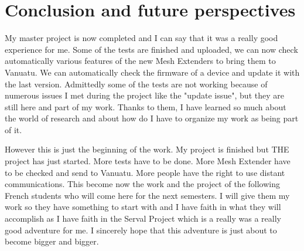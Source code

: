 \chapter{Conclusion and future perspectives}

My master project is now completed and I can say that it was a really good experience for me. Some of the tests are finished and uploaded, we can now check automatically various features of the new Mesh Extenders to bring them to Vanuatu. We can automatically check the firmware of a device and update it with the last version. Admittedly some of the tests are not working because of numerous issues I met during the project like the "update issue", but they are still here and part of my work. Thanks to them, I have learned so much about the world of research and about how do I have to organize my work as being part of it. 

\par
However this is just the beginning of the work. My project is finished but THE project has just started. More tests have to be done. More Mesh Extender have to be checked and send to Vanuatu. More people have the right to use distant communications. This become now the work and the project of the following French students who will come here for the next semesters. I will give them my work so they have something to start with and I have faith in what they will accomplish as I have faith in the Serval Project which is a really was a really good adventure for me. I sincerely hope that this adventure is just about to become bigger and bigger. 